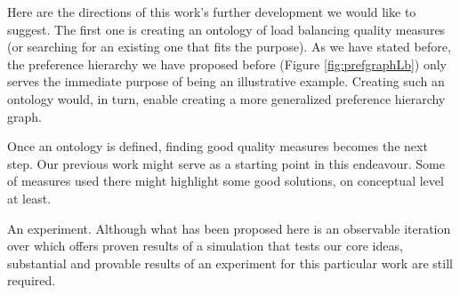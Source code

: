 Here are the directions of this work's further development we would like to suggest.
The first one is creating an ontology of load balancing quality measures (or searching for an existing one that fits the purpose).
As we have stated before, the preference hierarchy we have proposed before (Figure \ref{fig:prefgraphLb}) only serves the immediate purpose of being an illustrative example.
Creating such an ontology would, in turn, enable creating a more generalized preference hierarchy graph.

Once an ontology is defined, finding good quality measures becomes the next step.
Our previous work \cite{murashov-2022} might serve as a starting point in this endeavour.
Some of measures used there might highlight some good solutions, on conceptual level at least.

An experiment.
Although what has been proposed here is an observable iteration over \cite{murashov-2022} which offers proven results of a simulation that tests our core ideas, substantial and provable results of an experiment for this particular work are still required.
